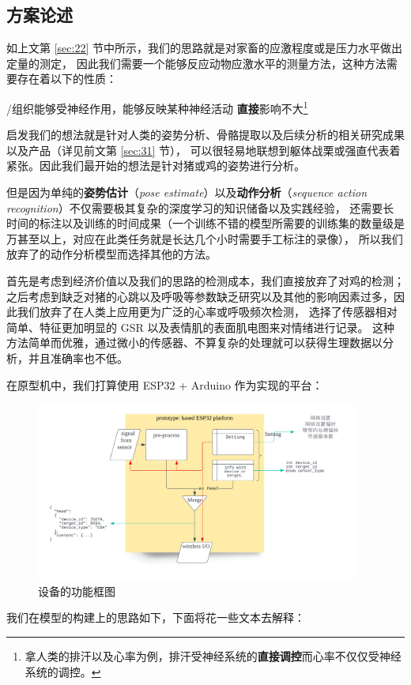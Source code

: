 \documentclass[UTF8]{ctexart}
\begin{document}
\subsection{方案论述}

如上文第 \ref{sec:22} 节中所示，我们的思路就是对家畜的应激程度或是压力水平做出定量的测定，
因此我们需要一个能够反应动物应激水平的测量方法，这种方法需要存在着以下的性质：

\begin{itemize}
    /组织能够受神经作用，能够反映某种神经活动
    \textbf{直接}影响不大\footnote{拿人类的排汗以及心率为例，排汗受神经系统的\textbf{直接调控}而心率不仅仅受神经系统的调控。}
\end{itemize}

启发我们的想法就是针对人类的姿势分析、骨骼提取以及后续分析的相关研究成果以及产品（详见前文第 \ref{sec:31} 节），
可以很轻易地联想到躯体战栗或强直代表着紧张。因此我们最开始的想法是针对猪或鸡的姿势进行分析。
\par
但是因为单纯的\textbf{姿势估计}（\emph{pose estimate}）以及\textbf{动作分析}（\emph{sequence action recognition}）不仅需要极其复杂的深度学习的知识储备以及实践经验，
还需要长时间的标注以及训练的时间成果（一个训练不错的模型所需要的训练集的数量级是万甚至以上，对应在此类任务就是长达几个小时需要手工标注的录像），
所以我们放弃了的动作分析模型而选择其他的方法。
\par
首先是考虑到经济价值以及我们的思路的检测成本，我们直接放弃了对鸡的检测；
之后考虑到缺乏对猪的心跳以及呼吸等参数缺乏研究以及其他的影响因素过多，因此我们放弃了在人类上应用更为广泛的心率或呼吸频次检测，
选择了传感器相对简单、特征更加明显的 GSR 以及表情肌的表面肌电图来对情绪进行记录。
这种方法简单而优雅，通过微小的传感器、不算复杂的处理就可以获得生理数据以分析，并且准确率也不低。
\par
在原型机中，我们打算使用 ESP32 + Arduino 作为实现的平台：
\begin{figure}[H]
\includegraphics[width=0.95\textwidth]{Chip.png}
\centering
\caption{设备的功能框图}
\end{figure}
\par
我们在模型的构建上的思路如下，下面将花一些文本去解释：
\begin{itemize}
\end{itemize}
\end{document}
